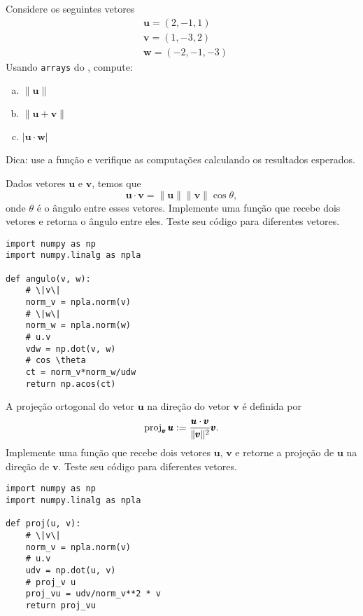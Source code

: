 \begin{exer}
  Considere os seguintes vetores
  \begin{align}
    &\pmb{u} = (2, -1, 1)\\
    &\pmb{v} = (1, -3, 2)\\
    &\pmb{w} = (-2, -1, -3)
  \end{align}
  Usando \texttt{arrays} do {\numpy}, compute:
  \begin{enumerate}[a)]
  \item $\|\pmb{u}\|$
  \item $\|\pmb{u} + \pmb{v}\|$
  \item $|\pmb{u}\cdot \pmb{w}|$
  \end{enumerate}
\end{exer}
\begin{resp}
  Dica: use a função {\PYTHONnumpyDOTlinalgDOTnorm} e verifique as computações calculando os resultados esperados.
\end{resp}

\begin{exer}
  Dados vetores $\pmb{u}$ e $\pmb{v}$, temos que
  \begin{equation}
    \pmb{u}\cdot\pmb{v} = \|\pmb{u}\|\|\pmb{v}\|\cos\theta,
  \end{equation}
  onde $\theta$ é o ângulo entre esses vetores. Implemente uma função que recebe dois vetores e retorna o ângulo entre eles. Teste seu código para diferentes vetores.
\end{exer}
\begin{resp}

\begin{lstlisting}
import numpy as np
import numpy.linalg as npla

def angulo(v, w):
    # \|v\|
    norm_v = npla.norm(v)
    # \|w\|
    norm_w = npla.norm(w)
    # u.v
    vdw = np.dot(v, w)
    # cos \theta
    ct = norm_v*norm_w/udw
    return np.acos(ct)
\end{lstlisting}

\end{resp}

\begin{exer}
  A projeção ortogonal do vetor $\pmb{u}$ na direção do vetor $\pmb{v}$ é definida por
  \begin{equation}
    \operatorname{proj}_{\pmb{v}} \pmb{u} := \frac{\pmb{u}\cdot\pmb{v}}{\|\pmb{v}\|^2}\pmb{v}.
  \end{equation}
  Implemente uma função que recebe dois vetores $\pmb{u}$, $\pmb{v}$ e retorne a projeção de $\pmb{u}$ na direção de $\pmb{v}$. Teste seu código para diferentes vetores.
\end{exer}
\begin{resp}

\begin{lstlisting}
import numpy as np
import numpy.linalg as npla

def proj(u, v):
    # \|v\|
    norm_v = npla.norm(v)
    # u.v
    udv = np.dot(u, v)
    # proj_v u
    proj_vu = udv/norm_v**2 * v
    return proj_vu
\end{lstlisting}

\end{resp}

